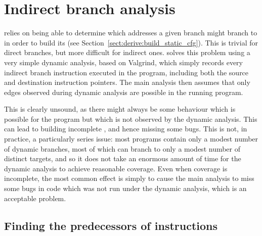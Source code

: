 \section{Indirect branch analysis}
\label{sect:program_model:indirect_branches}


{\Technique} relies on being able to determine which addresses a given
branch might branch to in order to build its  (see
Section~\ref{sect:derive:build_static_cfg}).  This is trivial for
direct branches, but more difficult for indirect ones.
{\Implementation} solves this problem using a very simple dynamic
analysis, based on Valgrind\needCite{}, which simply records every
indirect branch instruction executed in the program, including both
the source and destination instruction pointers.  The main analysis
then assumes that only edges observed during dynamic analysis are
possible in the running program.

This is clearly unsound, as there might always be some behaviour which
is possible for the program but which is not observed by the dynamic
analysis.  This can lead to {\technique} building incomplete
, and hence missing some bugs.  This is not, in
practice, a particularly series issue: most programs contain only a
modest number of dynamic branches, most of which can branch to only a
modest number of distinct targets, and so it does not take an enormous
amount of time for the dynamic analysis to achieve reasonable
coverage.  Even when coverage is incomplete, the most common effect is
simply to cause the main analysis to miss some bugs in code which was
not run under the dynamic analysis, which is an acceptable problem.


\subsection{Finding the predecessors of instructions}
\label{sect:program_model:instr_predecessors}


